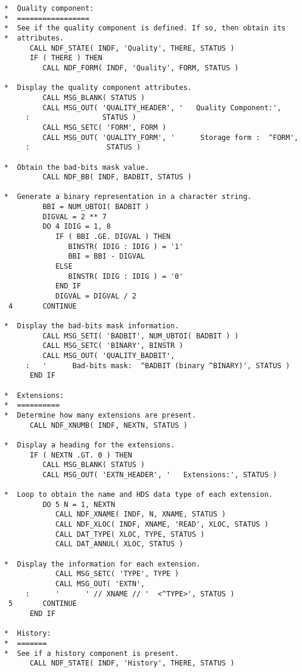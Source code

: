 \documentclass[twoside,11pt]{article}
\begin{document}
\begin{verbatim}
*  Quality component:
*  =================
*  See if the quality component is defined. If so, then obtain its
*  attributes.
      CALL NDF_STATE( INDF, 'Quality', THERE, STATUS )
      IF ( THERE ) THEN
         CALL NDF_FORM( INDF, 'Quality', FORM, STATUS )

*  Display the quality component attributes.
         CALL MSG_BLANK( STATUS )
         CALL MSG_OUT( 'QUALITY_HEADER', '   Quality Component:',
     :                 STATUS )
         CALL MSG_SETC( 'FORM', FORM )
         CALL MSG_OUT( 'QUALITY_FORM', '      Storage form :  ^FORM',
     :                  STATUS )

*  Obtain the bad-bits mask value.
         CALL NDF_BB( INDF, BADBIT, STATUS )

*  Generate a binary representation in a character string.
         BBI = NUM_UBTOI( BADBIT )
         DIGVAL = 2 ** 7
         DO 4 IDIG = 1, 8
            IF ( BBI .GE. DIGVAL ) THEN
               BINSTR( IDIG : IDIG ) = '1'
               BBI = BBI - DIGVAL
            ELSE
               BINSTR( IDIG : IDIG ) = '0'
            END IF
            DIGVAL = DIGVAL / 2
 4       CONTINUE

*  Display the bad-bits mask information.
         CALL MSG_SETI( 'BADBIT', NUM_UBTOI( BADBIT ) )
         CALL MSG_SETC( 'BINARY', BINSTR )
         CALL MSG_OUT( 'QUALITY_BADBIT',
     :   '      Bad-bits mask:  ^BADBIT (binary ^BINARY)', STATUS )
      END IF

*  Extensions:
*  ==========
*  Determine how many extensions are present.
      CALL NDF_XNUMB( INDF, NEXTN, STATUS )

*  Display a heading for the extensions.
      IF ( NEXTN .GT. 0 ) THEN
         CALL MSG_BLANK( STATUS )
         CALL MSG_OUT( 'EXTN_HEADER', '   Extensions:', STATUS )

*  Loop to obtain the name and HDS data type of each extension.
         DO 5 N = 1, NEXTN
            CALL NDF_XNAME( INDF, N, XNAME, STATUS )
            CALL NDF_XLOC( INDF, XNAME, 'READ', XLOC, STATUS )
            CALL DAT_TYPE( XLOC, TYPE, STATUS )
            CALL DAT_ANNUL( XLOC, STATUS )

*  Display the information for each extension.
            CALL MSG_SETC( 'TYPE', TYPE )
            CALL MSG_OUT( 'EXTN',
     :      '      ' // XNAME // '  <^TYPE>', STATUS )
 5       CONTINUE
      END IF

*  History:
*  =======
*  See if a history component is present.
      CALL NDF_STATE( INDF, 'History', THERE, STATUS )


\end{verbatim}
\end{document}
